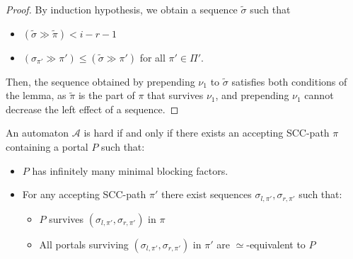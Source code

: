 \documentclass[letterpaper, USenglish, cleveref, autoref, thm-restate, numberwithinsect]{lipics-v2021}
\theoremstyle{theorem}
\theoremstyle{definition}
\newcommand{\Aa}{\mathcal{A}}
\newcommand{\equivportals}{\simeq}
\newcommand{\lefteffect}[2]{(#1 \gg #2)}
\newcommand{\SCCpath}{\pi}
\begin{document}
\begin{proof}
	By induction hypothesis, we obtain a sequence $\tilde{\sigma}$ such that 
	\begin{itemize}
		\item $\lefteffect{\tilde{\sigma}}{\tilde{\SCCpath}} < i-r-1$
		\item $\lefteffect{\sigma_{\SCCpath'}}{\SCCpath'} \leq \lefteffect{\tilde{\sigma}}{\SCCpath'}$ for all $\SCCpath' \in \Pi'$.
	\end{itemize}
	Then, the sequence obtained by prepending $\nu_1$ to $\tilde{\sigma}$ satisfies both conditions of the lemma, as $\tilde{\SCCpath}$ is the part of $\SCCpath$ that survives $\nu_1$, and prepending $\nu_1$ cannot decrease the left effect of a sequence.
\end{proof}

\begin{lemma}\label{lem:charac-hard-PSPACE}
	An automaton $\Aa$ is hard if and only if there exists an accepting SCC-path $\SCCpath$ containing a portal $P$ such that:
	\begin{itemize}
		\item $P$ has infinitely many minimal blocking factors.
		\item For any accepting SCC-path $\SCCpath'$ there exist sequences $\sigma_{l, \SCCpath'}, \sigma_{r, \SCCpath'}$ such that: 
		\begin{itemize}
			\item $P$ survives $(\sigma_{l, \SCCpath'}, \sigma_{r, \SCCpath'})$ in $\SCCpath$
			\item All portals surviving $(\sigma_{l, \SCCpath'}, \sigma_{r, \SCCpath'})$ in $\SCCpath'$ are $\equivportals$-equivalent to $P$
		\end{itemize} 
	\end{itemize} 
\end{lemma}
\end{document}
